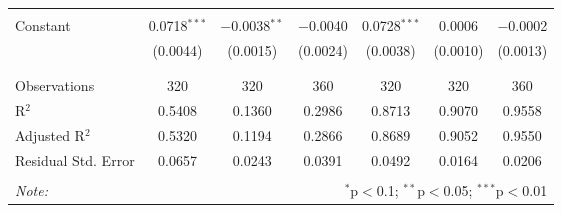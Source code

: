 \begin{table}[!htbp]
\begin{tabular}{@{\extracolsep{5pt}}lcccccc}
  & & & & & & \\ 
 Constant & 0.0718$^{***}$ & $-$0.0038$^{**}$ & $-$0.0040 & 0.0728$^{***}$ & 0.0006 & $-$0.0002 \\ 
  & (0.0044) & (0.0015) & (0.0024) & (0.0038) & (0.0010) & (0.0013) \\ 
  & & & & & & \\ 
\hline \\[-1.8ex] 
Observations & 320 & 320 & 360 & 320 & 320 & 360 \\ 
R$^{2}$ & 0.5408 & 0.1360 & 0.2986 & 0.8713 & 0.9070 & 0.9558 \\ 
Adjusted R$^{2}$ & 0.5320 & 0.1194 & 0.2866 & 0.8689 & 0.9052 & 0.9550 \\ 
Residual Std. Error & 0.0657 & 0.0243 & 0.0391 & 0.0492 & 0.0164 & 0.0206 \\ 
\hline 
\hline \\[-1.8ex] 
\textit{Note:}  & \multicolumn{6}{r}{$^{*}$p$<$0.1; $^{**}$p$<$0.05; $^{***}$p$<$0.01} \\ 
\end{tabular} 
\end{table} 
